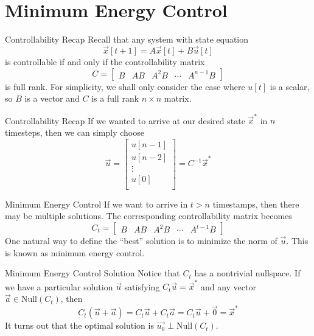 \section{Minimum Energy Control}

\begin{frame}{Controllability Recap}
	Recall that any system with state equation
	\[
		\vec{x}[t+1] = A\vec{x}[t] + B\vec{u}[t]
	\]
   	is controllable if and only if the controllability matrix
    \[
        C = 
        \begin{bmatrix}
        B & AB & A^2B & \cdots & A^{n-1}B
        \end{bmatrix}
    \]
    is full rank. For simplicity, we shall only consider the case where $u[t]$ is a scalar, so $B$ is a vector and $C$ is a full rank $n \times n$ matrix.
\end{frame}

\begin{frame}{Controllability Recap}
	If we wanted to arrive at our desired state $\vec{x}^*$ in $n$ timesteps, then we can simply choose
	\[
		\vec{u} 
		=
		\begin{bmatrix}
			u[n-1] \\
			u[n-2] \\
			\vdots \\
			u[0] \\
		\end{bmatrix}
		=
		C^{-1}\vec{x}^*
	\]
\end{frame}

\begin{frame}{Minimum Energy Control}
	If we want to arrive in $t > n$ timestamps, then there may be multiple solutions. The corresponding controllability matrix becomes
    \[
        C_t = 
        \begin{bmatrix}
        B & AB & A^2B & \cdots & A^{t-1}B
        \end{bmatrix}
    \]
	One natural way to define the ``best'' solution is to minimize the norm of $\vec{u}$. This is known as minimum energy control.
\end{frame}

\begin{frame}{Minimum Energy Control Solution}
	Notice that $C_t$ has a nontrivial nullspace. If we have a particular solution $\vec{u}$ satisfying $C_t \vec{u} = \vec{x}^*$ and any vector $\vec{a} \in \mathrm{Null}(C_t)$, then
	\[
	C_t(\vec{u} + \vec{a}) = C_t\vec{u} + C_t\vec{a} = C_t\vec{u} + \vec{0} = \vec{x}^*
	\]
	It turns out that the optimal solution is $\vec{u_0} \perp \mathrm{Null}(C_t)$.
\end{frame}

